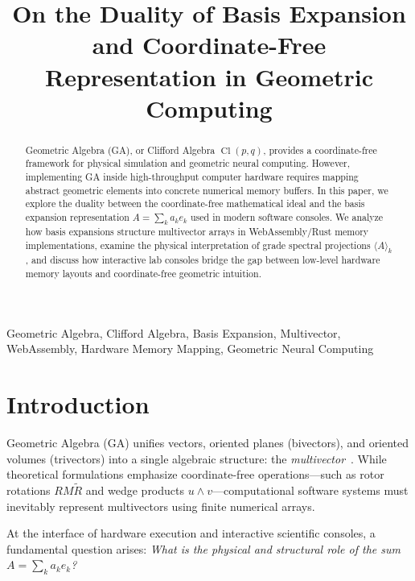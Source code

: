 \documentclass[conference]{IEEEtran}
\begin{document}
\title{On the Duality of Basis Expansion and Coordinate-Free Representation in Geometric Computing}

\author{}

\maketitle

\begin{abstract}
Geometric Algebra (GA), or Clifford Algebra $\operatorname{Cl}(p,q)$, provides a coordinate-free framework for physical simulation and geometric neural computing. However, implementing GA inside high-throughput computer hardware requires mapping abstract geometric elements into concrete numerical memory buffers. In this paper, we explore the duality between the coordinate-free mathematical ideal and the basis expansion representation $A = \sum_k a_k e_k$ used in modern software consoles. We analyze how basis expansions structure multivector arrays in WebAssembly/Rust memory implementations, examine the physical interpretation of grade spectral projections $\langle A \rangle_k$, and discuss how interactive lab consoles bridge the gap between low-level hardware memory layouts and coordinate-free geometric intuition.
\end{abstract}

\begin{IEEEkeywords}
Geometric Algebra, Clifford Algebra, Basis Expansion, Multivector, WebAssembly, Hardware Memory Mapping, Geometric Neural Computing
\end{IEEEkeywords}

\section{Introduction}

Geometric Algebra (GA) unifies vectors, oriented planes (bivectors), and oriented volumes (trivectors) into a single algebraic structure: the \textit{multivector}~\cite{b_hestenes}. While theoretical formulations emphasize coordinate-free operations---such as rotor rotations $R M \tilde{R}$ and wedge products $u \wedge v$---computational software systems must inevitably represent multivectors using finite numerical arrays.

At the interface of hardware execution and interactive scientific consoles, a fundamental question arises: \textit{What is the physical and structural role of the sum $A = \sum_k a_k e_k$?}
\end{document}
